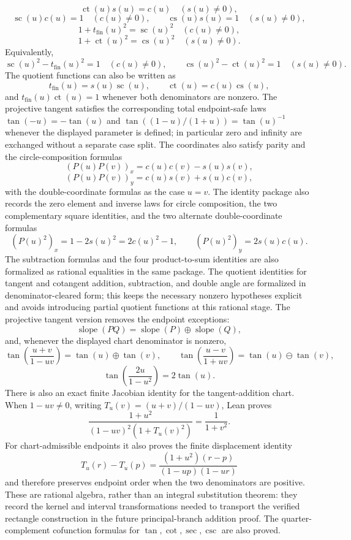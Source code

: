 \begin{theorem}
\[\]
\[
  \operatorname{ct}(u)s(u)=c(u)\quad(s(u)\ne0),
\]
\[
  \operatorname{sc}(u)c(u)=1\quad(c(u)\ne0),
  \qquad
  \operatorname{cs}(u)s(u)=1\quad(s(u)\ne0),
\]
\[
  1+t_{\mathrm{fin}}(u)^2=\operatorname{sc}(u)^2\quad(c(u)\ne0),
\]
\[
  1+\operatorname{ct}(u)^2=\operatorname{cs}(u)^2\quad(s(u)\ne0).
\]
Equivalently,
\[
  \operatorname{sc}(u)^2-t_{\mathrm{fin}}(u)^2=1\quad(c(u)\ne0),
  \qquad
  \operatorname{cs}(u)^2-\operatorname{ct}(u)^2=1\quad(s(u)\ne0).
\]
The quotient functions can also be written as
\[
  t_{\mathrm{fin}}(u)=s(u)\operatorname{sc}(u),
  \qquad
  \operatorname{ct}(u)=c(u)\operatorname{cs}(u),
\]
and \(t_{\mathrm{fin}}(u)\operatorname{ct}(u)=1\) whenever both denominators
are nonzero.  The projective tangent satisfies the corresponding total
endpoint-safe laws \(\tan(-u)=-\tan(u)\) and
\(\tan((1-u)/(1+u))=\tan(u)^{-1}\) whenever the displayed parameter is
defined; in particular zero and infinity are exchanged without a separate
case split.  The coordinates also satisfy parity and the circle-composition formulas
\[
  (P(u)P(v))_x=c(u)c(v)-s(u)s(v),
\]
\[
  (P(u)P(v))_y=c(u)s(v)+s(u)c(v),
\]
with the double-coordinate formulas as the case \(u=v\).
The identity package also records the zero element and inverse laws for
circle composition, the two complementary square identities, and the two
alternate double-coordinate formulas
\[
  (P(u)^2)_x=1-2s(u)^2=2c(u)^2-1,
  \qquad
  (P(u)^2)_y=2s(u)c(u).
\]
The subtraction formulas and the four product-to-sum identities are also
formalized as rational equalities in the same package.
The quotient identities for tangent and cotangent addition, subtraction, and
double angle are formalized in denominator-cleared form; this keeps the
necessary nonzero hypotheses explicit and avoids introducing partial quotient
functions at this rational stage.  The projective tangent version removes the
endpoint exceptions:
\[
  \operatorname{slope}(PQ)=\operatorname{slope}(P)\oplus
  \operatorname{slope}(Q),
\]
and, whenever the displayed chart denominator is nonzero,
\[
  \tan\!\left(\frac{u+v}{1-uv}\right)=\tan(u)\oplus\tan(v),\qquad
  \tan\!\left(\frac{u-v}{1+uv}\right)=\tan(u)\ominus\tan(v),
\]
\[
  \tan\!\left(\frac{2u}{1-u^2}\right)=2\tan(u).
\]
There is also an exact finite Jacobian identity for the tangent-addition
chart.  When \(1-uv\ne0\), writing
\(T_u(v)=(u+v)/(1-uv)\), Lean proves
\[
  \frac{1+u^2}{(1-uv)^2(1+T_u(v)^2)}=\frac{1}{1+v^2}.
\]
For chart-admissible endpoints it also proves the finite displacement identity
\[
 T_u(r)-T_u(p)=
 \frac{(1+u^2)(r-p)}{(1-up)(1-ur)}
\]
and therefore preserves endpoint order when the two denominators are positive.
These are rational algebra, rather than an integral substitution theorem: they
record the kernel and interval transformations needed to transport the
verified rectangle construction in the future principal-branch addition proof.
The quarter-complement cofunction formulas for \(\tan,\cot,\sec,\csc\) are
also proved.
\end{theorem}

